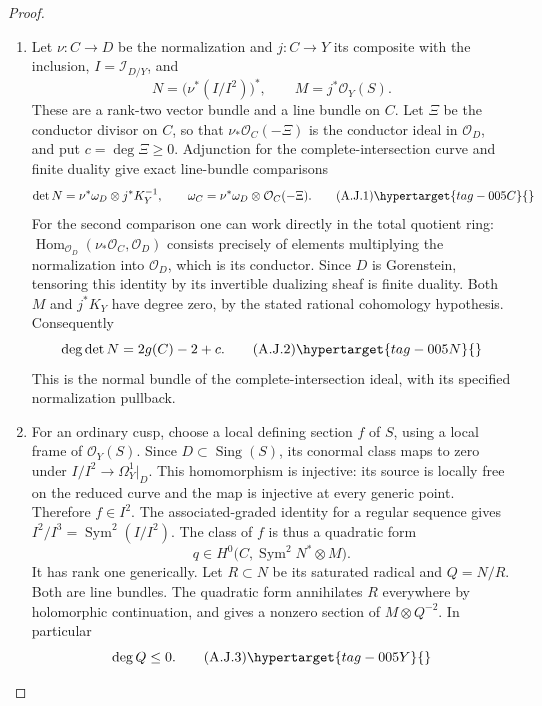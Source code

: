 \begin{proof}

\begin{enumerate}[label=\arabic*.,leftmargin=*]
\item Let $\nu:C\to D$ be the normalization and $j:C\to Y$
its composite with the inclusion,
$I=\mathcal I_{D/Y}$, and
\[
 N=\bigl(\nu^*(I/I^2)\bigr)^*,\qquad
 M=j^*\mathcal O_Y(S).
\]
These are a rank-two vector bundle and a line bundle on $C$.
Let $\Xi$ be the conductor divisor on $C$, so that
$\nu_*\mathcal O_C(-\Xi)$ is the conductor ideal in
$\mathcal O_D$, and put $c=\deg\Xi\geq0$.
Adjunction for the complete-intersection curve and finite
duality give exact line-bundle comparisons
\[
 \det N=\nu^*\omega_D\otimes j^*K_Y^{-1},\qquad
 \omega_C=\nu^*\omega_D\otimes\mathcal O_C(-\Xi).
                                                        \tag{A.J.1}\hypertarget{tag-005C}{}\label{cdp:eq:A.J.1}
\]
For the second comparison one can work directly in the total
quotient ring: $\operatorname{Hom}_{\mathcal O_D}
(\nu_*\mathcal O_C,\mathcal O_D)$ consists precisely of
elements multiplying the normalization into $\mathcal O_D$,
which is its conductor. Since $D$ is Gorenstein, tensoring
this identity by its invertible dualizing sheaf is finite
duality. Both $M$ and $j^*K_Y$ have degree zero, by the
stated rational cohomology hypothesis. Consequently
\[
 \deg\det N=2g(C)-2+c.                              \tag{A.J.2}\hypertarget{tag-005N}{}\label{cdp:eq:A.J.2}
\]
This is the normal bundle of the complete-intersection ideal,
with its specified normalization pullback.

\item For an ordinary cusp, choose a local defining section
$f$ of $S$, using a local frame of $\mathcal O_Y(S)$.
Since $D\subset\operatorname{Sing}(S)$, its conormal class
maps to zero under
$I/I^2\to\Omega_Y^1|_D$. This homomorphism is injective:
its source is locally free on the reduced curve and the map
is injective at every generic point. Therefore $f\in I^2$.
The associated-graded identity for a regular sequence gives
$I^2/I^3=\operatorname{Sym}^2(I/I^2)$. The class of $f$
is thus a quadratic form
\[
 q\in H^0\bigl(C,\operatorname{Sym}^2N^*\otimes M\bigr).
\]
It has rank one generically. Let $R\subset N$ be its
saturated radical and $Q=N/R$. Both are line bundles.
The quadratic form annihilates $R$ everywhere by holomorphic
continuation, and gives a nonzero section of $M\otimes Q^{-2}$.
In particular
\[
 \deg Q\leq0.                                      \tag{A.J.3}\hypertarget{tag-005Y}{}\label{cdp:eq:A.J.3}
\]


\end{enumerate}
\end{proof}
